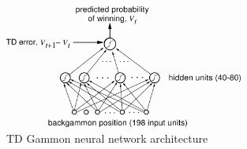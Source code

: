 \begin{figure}[H]
  \centering
  \includegraphics[width=0.7\textwidth]{figures/images/td_gammon.png}
  \caption[TD Gammon neural network]{TD Gammon neural network architecture \cite{sutton2018reinforcement}}
  \label{fig:td_gammon}
\end{figure}
